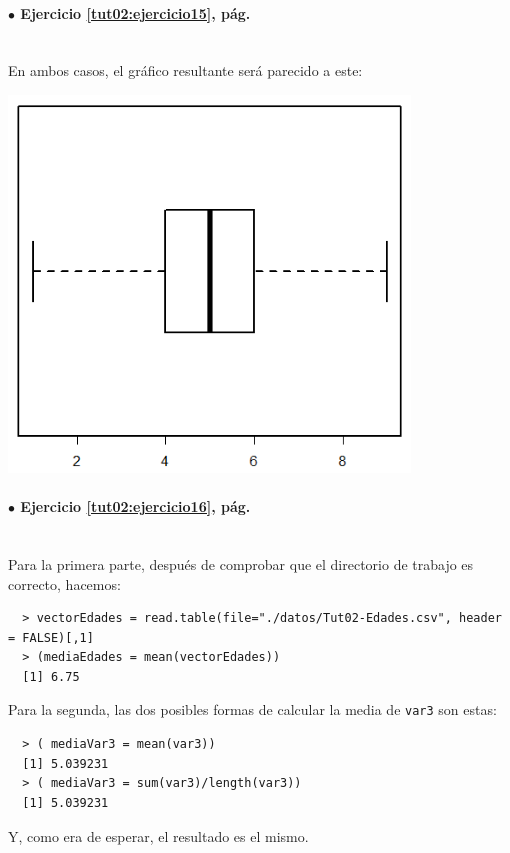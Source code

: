 \documentclass[10pt,a4paper]{article}\usepackage[]{graphicx}\usepackage[]{color}
\begin{document}
\paragraph{\bf $\bullet$ Ejercicio \ref{tut02:ejercicio15},  pág. \pageref{tut02:ejercicio15}}
\label{tut02:ejercicio15:sol}\quad\\

En ambos casos, el gráfico resultante será parecido a este:
    \begin{center}
    \includegraphics[height=10cm]{../fig/Tut02-58.png}
    \end{center}

\paragraph{\bf $\bullet$ Ejercicio \ref{tut02:ejercicio16},  pág. \pageref{tut02:ejercicio16}}
\label{tut02:ejercicio16:sol}\quad\\
Para la primera parte, después de comprobar que el directorio de trabajo es correcto, hacemos:
\begin{verbatim}
  > vectorEdades = read.table(file="./datos/Tut02-Edades.csv", header = FALSE)[,1]
  > (mediaEdades = mean(vectorEdades))
  [1] 6.75
\end{verbatim}
Para la segunda, las dos posibles formas de calcular la media de {\tt var3} son estas:
\begin{verbatim}
  > ( mediaVar3 = mean(var3))
  [1] 5.039231
  > ( mediaVar3 = sum(var3)/length(var3))
  [1] 5.039231
\end{verbatim}
Y, como era de esperar, el resultado es el mismo.
\end{document}
